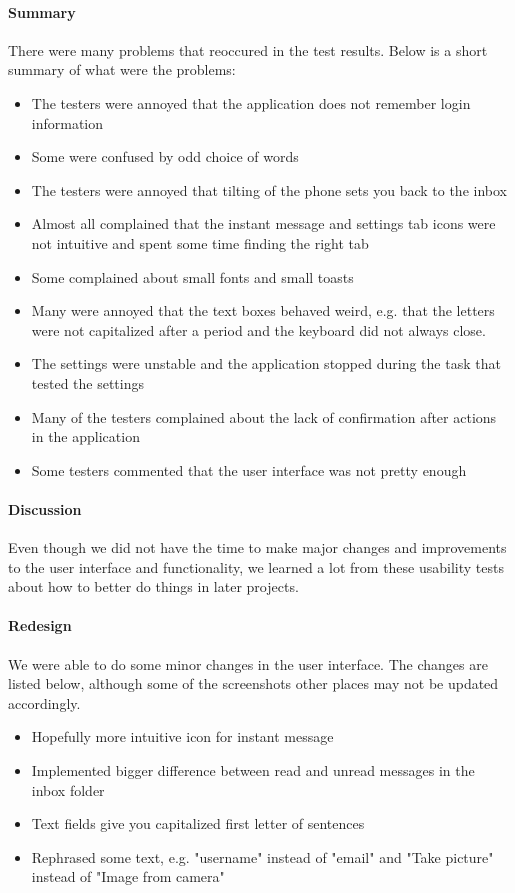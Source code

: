 \paragraph{Summary}\hfill
\newline
			There were many problems that reoccured in the test results. Below is a short summary of what were the problems:
			\begin{itemize}
				\item{}The testers were annoyed that the application does not remember login information
				\item{}Some were confused by odd choice of words
				\item{}The testers were annoyed that tilting of the phone sets you back to the inbox
				\item{}Almost all complained that the instant message and settings tab icons were not intuitive and spent some time finding the right tab
				\item{}Some complained about small fonts and small toasts
				\item{}Many were annoyed that the text boxes behaved weird, e.g. that the letters were not capitalized after a period and the keyboard did not always close.
				\item{}The settings were unstable and the application stopped during the task that tested the settings
				\item{}Many of the testers complained about the lack of confirmation after actions in the application
				\item{}Some testers commented that the user interface was not pretty enough
			\end{itemize}
		\paragraph{Discussion}\hfill
\newline
Even though we did not have the time to make major changes and improvements to the user interface and functionality, we learned a lot from these usability tests about how to better do things in later projects.
		
\paragraph{Redesign}\hfill
\newline
		We were able to do some minor changes in the user interface. The changes are listed below, although some of the screenshots other places may not be updated accordingly.
		\begin{itemize}
			\item{}Hopefully more intuitive icon for instant message
			\item{}Implemented bigger difference between read and unread messages in the inbox folder
			\item{}Text fields give you capitalized first letter of sentences
			\item{}Rephrased some text, e.g. "username" instead of "email" and "Take picture" instead of "Image from camera"
		\end{itemize}


